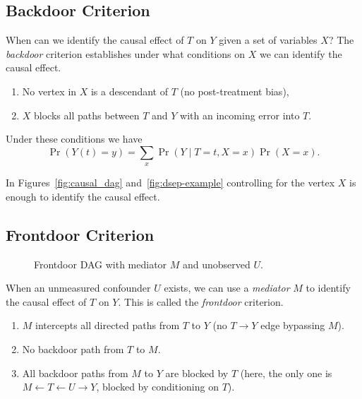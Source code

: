 \documentclass[11pt]{exam}
\begin{document}
\subsection{Backdoor Criterion}
When can we identify the causal effect of $T$ on $Y$ given a set of variables $X$? The \emph{backdoor} criterion establishes under what conditions on $X$ we can identify the causal effect.
\begin{enumerate}
    \item No vertex in $X$ is a descendant of $T$ (no post-treatment bias),
    \item $X$ blocks all paths between $T$ and $Y$ with an incoming error into $T$.
\end{enumerate}
Under these conditions we have 
\[
    \Pr(Y(t) = y) = \sum_x \Pr(Y \mid T = t, X = x) \Pr(X = x).
\]
\begin{example}
   In Figures~\ref{fig:causal_dag} and~\ref{fig:dsep-example} controlling for the vertex $X$ is enough to identify the causal effect.
\end{example}


\subsection{Frontdoor Criterion}\label{subsec:frontdoor}

\begin{figure}[h!]
\centering
{}
\caption{Frontdoor DAG with mediator $M$ and unobserved $U$.}
\label{fig:frontdoor}
\end{figure}

When an unmeasured confounder $U$ exists, we can use a \emph{mediator} $M$ to identify the causal effect of $T$ on $Y$. This is called the \emph{frontdoor} criterion.

\begin{enumerate}
  \item $M$ intercepts all directed paths from $T$ to $Y$ (no $T\to Y$ edge bypassing $M$).
  \item No backdoor path from $T$ to $M$.
  \item All backdoor paths from $M$ to $Y$ are blocked by $T$
        (here, the only one is $M \leftarrow T \leftarrow U \to Y$, blocked by conditioning on $T$).
\end{enumerate}
\end{document}
